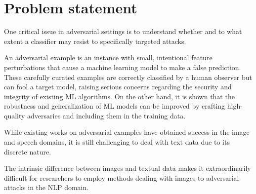 \section{Problem statement}\label{sec:problem-statement}

One critical issue in adversarial settings is to understand whether and to what extent a classifier may resist to specifically targeted attacks.

An adversarial example is an instance with small, intentional feature perturbations that cause a machine learning model to make a false prediction.
These carefully curated examples are correctly classified by a human observer but can fool a target model, raising serious concerns regarding the security and integrity of existing ML algorithms. 
On the other hand, it is shown that the robustness and generalization of ML models can be improved by crafting high-quality adversaries and including them in the training data.

While existing works on adversarial examples have obtained success in the image and speech domains, it is still challenging to deal with text data due to its discrete nature.

The intrinsic difference between images and textual data makes it extraordinarily difficult for
researchers to employ methods dealing with images to adversarial attacks in the NLP domain.
